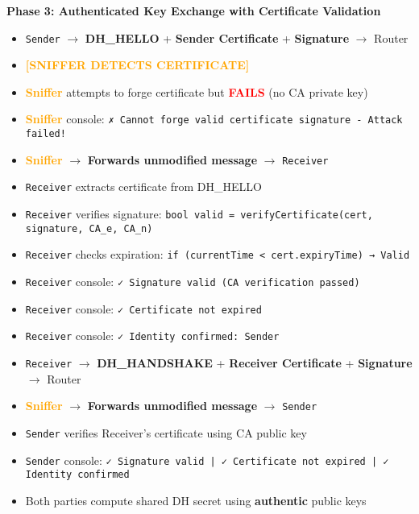 \documentclass[a4paper,12pt]{extarticle}
\begin{document}
\vspace{0.3cm}
\textbf{Phase 3: Authenticated Key Exchange with Certificate Validation}
\begin{itemize}[leftmargin=1cm]
    \item \texttt{Sender} $\rightarrow$ \textcolor{maincolor}{\textbf{DH\_HELLO}} + \textcolor{sectioncolor}{\textbf{Sender Certificate}} + \textcolor{sectioncolor}{\textbf{Signature}} $\rightarrow$ Router
    \item \textcolor{orange}{\textbf{[SNIFFER DETECTS CERTIFICATE]}}
    \item \textcolor{orange}{\textbf{Sniffer}} attempts to forge certificate but \textcolor{red}{\textbf{FAILS}} (no CA private key)
    \item \textcolor{orange}{\textbf{Sniffer}} console: \texttt{✗ Cannot forge valid certificate signature - Attack failed!}
    \item \textcolor{orange}{\textbf{Sniffer}} $\rightarrow$ \textcolor{maincolor}{\textbf{Forwards unmodified message}} $\rightarrow$ \texttt{Receiver}
    \item \texttt{Receiver} extracts certificate from DH\_HELLO
    \item \texttt{Receiver} verifies signature: \texttt{bool valid = verifyCertificate(cert, signature, CA\_e, CA\_n)}
    \item \texttt{Receiver} checks expiration: \texttt{if (currentTime < cert.expiryTime) → Valid}
    \item \texttt{Receiver} console: \texttt{✓ Signature valid (CA verification passed)}
    \item \texttt{Receiver} console: \texttt{✓ Certificate not expired}
    \item \texttt{Receiver} console: \texttt{✓ Identity confirmed: Sender}
    \item \texttt{Receiver} $\rightarrow$ \textcolor{maincolor}{\textbf{DH\_HANDSHAKE}} + \textcolor{sectioncolor}{\textbf{Receiver Certificate}} + \textcolor{sectioncolor}{\textbf{Signature}} $\rightarrow$ Router
    \item \textcolor{orange}{\textbf{Sniffer}} $\rightarrow$ \textcolor{maincolor}{\textbf{Forwards unmodified message}} $\rightarrow$ \texttt{Sender}
    \item \texttt{Sender} verifies Receiver's certificate using CA public key
    \item \texttt{Sender} console: \texttt{✓ Signature valid | ✓ Certificate not expired | ✓ Identity confirmed}
    \item Both parties compute shared DH secret using \textbf{authentic} public keys
\end{itemize}
\end{document}
